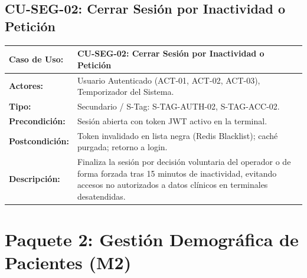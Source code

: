 \documentclass[12pt,a4paper]{report}
\begin{document}
\subsection{CU-SEG-02: Cerrar Sesión por Inactividad o Petición}
\begin{table}[H]
\centering
\small
\begin{tabularx}{\textwidth}{|L{3.5cm}|X|}
\hline
{}\color{white}\textbf{Caso de Uso:} & \textbf{CU-SEG-02: Cerrar Sesión por Inactividad o Petición} \\
\hline
\textbf{Actores:} & Usuario Autenticado (ACT-01, ACT-02, ACT-03), Temporizador del Sistema. \\
\hline
\textbf{Tipo:} & Secundario / S-Tag: S-TAG-AUTH-02, S-TAG-ACC-02. \\
\hline
\textbf{Precondición:} & Sesión abierta con token JWT activo en la terminal. \\
\hline
\textbf{Postcondición:} & Token invalidado en lista negra (Redis Blacklist); caché purgada; retorno a login. \\
\hline
\textbf{Descripción:} & Finaliza la sesión por decisión voluntaria del operador o de forma forzada tras 15 minutos de inactividad, evitando accesos no autorizados a datos clínicos en terminales desatendidas. \\
\hline
\end{tabularx}
\end{table}

\section{Paquete 2: Gestión Demográfica de Pacientes (M2)}
\end{document}
